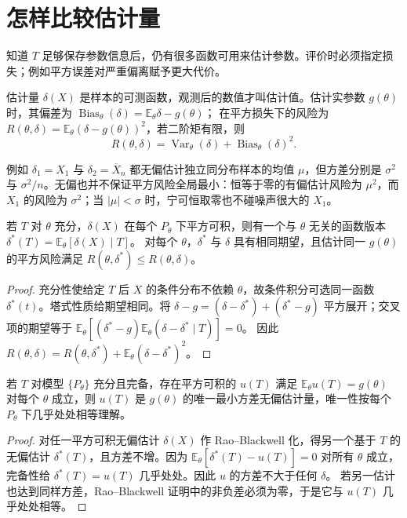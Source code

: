\section{怎样比较估计量}

知道 \(T\) 足够保存参数信息后，仍有很多函数可用来估计参数。评价时必须指定损失；例如平方误差对严重偏离赋予更大代价。

\begin{definition}[偏差、方差与风险]
估计量 \(\delta(X)\) 是样本的可测函数，观测后的数值才叫估计值。估计实参数 \(g(\theta)\) 时，其偏差为
\(\operatorname{Bias}_\theta(\delta)=\mathbb E_\theta\delta-g(\theta)\)；
在平方损失下的风险为
\(R(\theta,\delta)=\mathbb E_\theta(\delta-g(\theta))^2\)，若二阶矩有限，则
\[
R(\theta,\delta)=\operatorname{Var}_\theta(\delta)
+\operatorname{Bias}_\theta(\delta)^2.
\]
\end{definition}

例如 \(\delta_1=X_1\) 与 \(\delta_2=\overline X_n\) 都无偏估计独立同分布样本的均值 \(\mu\)，但方差分别是 \(\sigma^2\) 与 \(\sigma^2/n\)。无偏也并不保证平方风险全局最小：恒等于零的有偏估计风险为 \(\mu^2\)，而 \(X_1\) 的风险为 \(\sigma^2\)；当 \(|\mu|<\sigma\) 时，宁可恒取零也不碰噪声很大的 \(X_1\)。

\begin{theorem}
若 \(T\) 对 \(\theta\) 充分，\(\delta(X)\) 在每个 \(P_\theta\) 下平方可积，则有一个与 \(\theta\) 无关的函数版本
\(\delta^*(T)=\mathbb E_\theta[\delta(X)\mid T]\)。
对每个 \(\theta\)，\(\delta^*\) 与 \(\delta\) 具有相同期望，且估计同一 \(g(\theta)\) 的平方风险满足
\(R(\theta,\delta^*)\le R(\theta,\delta)\)。
\end{theorem}
\begin{proof}
充分性使给定 \(T\) 后 \(X\) 的条件分布不依赖 \(\theta\)，故条件积分可选同一函数 \(\delta^*(t)\)。塔式性质给期望相同。将
\(\delta-g=(\delta-\delta^*)+(\delta^*-g)\) 平方展开；交叉项的期望等于
\(\mathbb E_\theta[(\delta^*-g)\mathbb E_\theta(\delta-\delta^*\mid T)]=0\)。
因此
\(R(\theta,\delta)=R(\theta,\delta^*)+
\mathbb E_\theta(\delta-\delta^*)^2\)。
\end{proof}

\begin{theorem}
若 \(T\) 对模型 \(\{P_\theta\}\) 充分且完备，存在平方可积的 \(u(T)\) 满足
\(\mathbb E_\theta u(T)=g(\theta)\) 对每个 \(\theta\) 成立，则 \(u(T)\) 是 \(g(\theta)\) 的唯一最小方差无偏估计量，唯一性按每个 \(P_\theta\) 下几乎处处相等理解。
\end{theorem}
\begin{proof}
对任一平方可积无偏估计 \(\delta(X)\) 作 Rao--Blackwell 化，得另一个基于 \(T\) 的无偏估计 \(\delta^*(T)\)，且方差不增。因为
\(\mathbb E_\theta[\delta^*(T)-u(T)]=0\) 对所有 \(\theta\) 成立，完备性给
\(\delta^*(T)=u(T)\) 几乎处处。因此 \(u\) 的方差不大于任何 \(\delta\)。
若另一估计也达到同样方差，Rao--Blackwell 证明中的非负差必须为零，于是它与 \(u(T)\) 几乎处处相等。
\end{proof}

